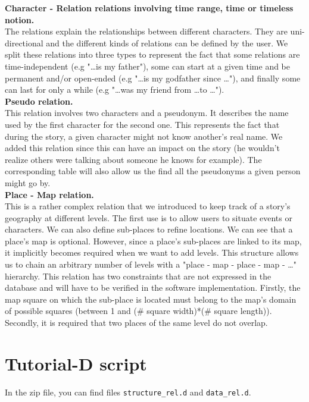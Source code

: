\documentclass[a4paper ,12pt,french]{article}
\begin{document}
\textbf{Character - Relation relations involving time range, time or timeless notion.} \\
The relations explain the relationships between different characters. They are uni-directional and the different kinds of relations can be defined by the user.
We split these relations into three types to represent the fact that some relations are time-independent (e.g "\dots is my father"), some can start at a given time and be permanent and/or open-ended (e.g "\dots is my godfather since \dots"), and finally some can last for only a while (e.g "\dots was my friend from \dots to \dots").\\

\textbf{Pseudo relation.} \\
This relation involves two characters and a pseudonym. It describes the name used by the first character for the second one. This represents the fact that during the story, a given character might not know another's real name. We added this relation since this can have an impact on the story (he wouldn't realize others were talking about someone he knows for example).
The corresponding table will also allow us the find all the pseudonyms a given person might go by.\\

\textbf{Place - Map relation.} \\
This is a rather complex relation that we introduced to keep track of a story's geography at different levels. The first use is to allow users to situate events or characters. We can also define sub-places to refine locations. 
We can see that a place's map is optional. However, since a place's sub-places are linked to its map, it implicitly  becomes required when we want to add levels. This structure allows us to chain an arbitrary number of levels with a "place - map - place - map - \dots" hierarchy.
This relation has two constraints that are not expressed in the database and will have to be verified in the software implementation. Firstly, the map square on which the sub-place is located must belong to the map's domain of possible squares (between 1 and (\# square width)*(\# square length)). Secondly, it is required that two places of the same level do not overlap.

\section{Tutorial-D script}

In the zip file, you can find files \texttt{structure\_rel.d} and \texttt{data\_rel.d}.\\
\end{document}
